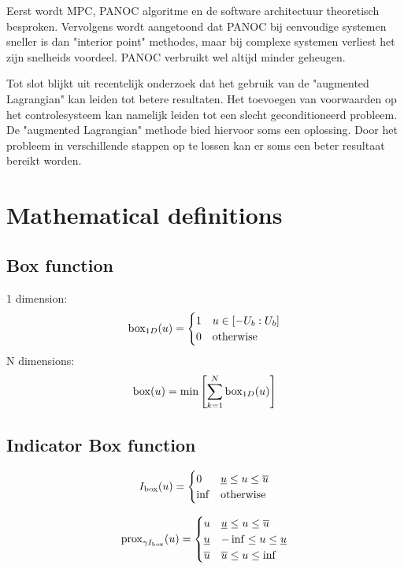 Eerst wordt MPC, PANOC algoritme en de software architectuur theoretisch besproken. Vervolgens wordt aangetoond dat PANOC bij eenvoudige systemen sneller is dan "interior point" methodes, maar bij complexe systemen verliest het zijn snelheids voordeel. PANOC verbruikt wel altijd minder geheugen.

Tot slot blijkt uit recentelijk onderzoek dat het gebruik van de "augmented Lagrangian" kan leiden tot betere resultaten. Het toevoegen van voorwaarden op het controlesysteem kan namelijk leiden tot een slecht geconditioneerd probleem. De "augmented Lagrangian" methode bied hiervoor soms een oplossing. Door het probleem in verschillende stappen op te lossen kan er soms een beter resultaat bereikt worden.

\chapter{Mathematical definitions}
	\section{Box function}
	\label{appendix:box function}
		1 dimension:
		\begin{equation}
			\operatorname{box}_{1D}(u) =
			\begin{cases}
				 1 & u \in [-U_b:U_b]\\
				 0 & \operatorname{otherwise}
			\end{cases}
			\label{eq:box function 1 dimension}
		\end{equation}
		N dimensions:
		\begin{equation}
			\operatorname{box}(u) = \min\left[ \sum_{k=1}^ N \operatorname{box}_{1D}(u) \right]
			\label{eq:box function N dimensions}
		\end{equation}
	\section{Indicator Box function}
	\label{appendix:indicator box function}
		\begin{equation}
			I_{\operatorname{box}}(u)=
			\begin{cases}
				0 & \underline{u}\leq u \leq \overline{u}\\
				\inf & \operatorname{otherwise}
			\end{cases}
		\end{equation}
		
		\begin{equation}
			\operatorname{prox}_{\gamma I_{\operatorname{box}}}(u)=
			\begin{cases}
				u & \underline{u}\leq u \leq \overline{u}\\
				\underline{u} & -\inf \leq u \leq \underline{u}\\
				\overline{u} & \overline{u}\leq u \leq \inf\\
			\end{cases}
		\end{equation}
	
